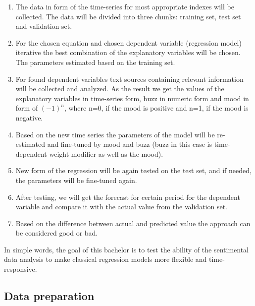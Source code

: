 \documentclass[12pt, a4paper]{article}
\begin{document}
\begin{enumerate}
	\item The data in form of the time-series for most appropriate indexes will be collected. The data will be divided into three chunks: training set, test set and validation set. 
	\item For the chosen equation and chosen dependent variable (regression model) iterative the best combination of the explanatory variables will be chosen. The parameters estimated based on the training set.
	\item For found dependent variables text sources containing relevant information will be collected and analyzed. As the result we get the values of the explanatory variables in time-series form, buzz in numeric form and mood in form of $(-1)^n$, where n=0, if the mood is positive and n=1, if the mood is negative.
	\item Based on the new time series the parameters of the model will be re-estimated and fine-tuned by mood and buzz (buzz in this case is time-dependent weight modifier as well as the mood).
	\item New form of the regression will be again tested on the test set, and if needed, the parameters will be fine-tuned again. 
	\item After testing, we will get the forecast for certain period for the dependent variable and compare it with the actual value from the validation set. 
	\item Based on the difference between actual and predicted value the approach can be considered good or bad.  
\end{enumerate}
In simple words, the goal of this bachelor is to test the ability of the sentimental data analysis to make classical regression models more flexible and time-responsive.

\subsection{Data preparation}
\end{document}
